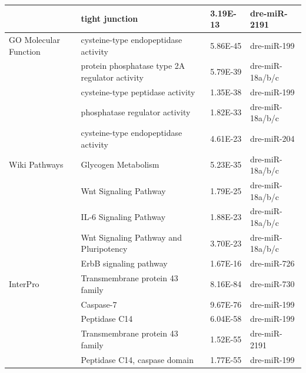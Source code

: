 \documentclass[12pt]{article}
\begin{document}
\begin{table}[h!]
{\begin{tabular}{llll}
                      & tight junction                                          & 3.19E-13         & dre-miR-2191           \\\hline
GO Molecular Function & cysteine-type endopeptidase activity                    & 5.86E-45         & dre-miR-199            \\
                      & protein phosphatase type 2A regulator activity          & 5.79E-39         & dre-miR-18a/b/c        \\
                      & cysteine-type peptidase activity                        & 1.35E-38         & dre-miR-199            \\
                      & phosphatase regulator activity                          & 1.82E-33         & dre-miR-18a/b/c        \\
                      & cysteine-type endopeptidase activity                    & 4.61E-23         & dre-miR-204            \\\hline
Wiki Pathways         & Glycogen Metabolism                                     & 5.23E-35         & dre-miR-18a/b/c        \\
                      & Wnt Signaling Pathway                                   & 1.79E-25         & dre-miR-18a/b/c        \\
                      & IL-6 Signaling Pathway                                  & 1.88E-23         & dre-miR-18a/b/c        \\
                      & Wnt Signaling Pathway and Pluripotency                  & 3.70E-23         & dre-miR-18a/b/c        \\
                      & ErbB signaling pathway                                  & 1.67E-16         & dre-miR-726            \\\hline
InterPro              & Transmembrane protein 43 family                         & 8.16E-84         & dre-miR-730            \\
                      & Caspase-7                                               & 9.67E-76         & dre-miR-199            \\
                      & Peptidase C14                                           & 6.04E-58         & dre-miR-199            \\
                      & Transmembrane protein 43 family                         & 1.52E-55         & dre-miR-2191           \\
                      & Peptidase C14, caspase domain                           & 1.77E-55         & dre-miR-199            \\\hline

\end{tabular}}
\end{table}
\end{document}
